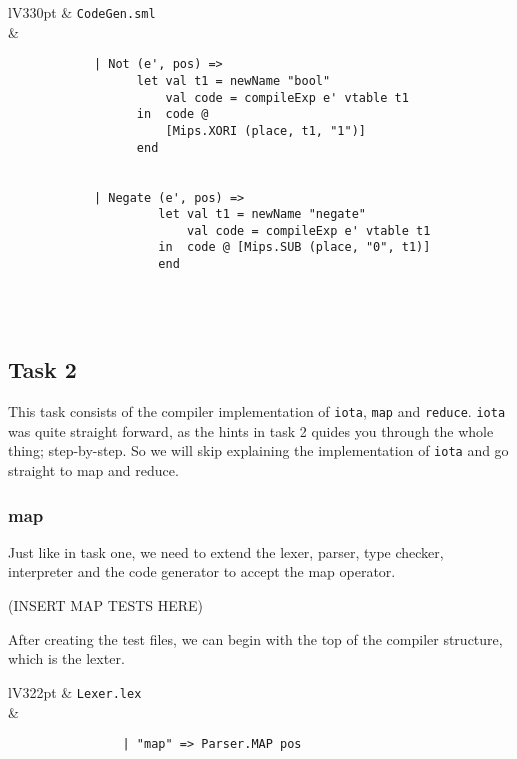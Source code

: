 \documentclass[a4paper]{article}
\begin{document}
\begin{center}	
	\begin{tabular}{lV{330pt}}
		\toprule
		& \verb|CodeGen.sml|\\
		\midrule
		&
		\begin{verbatim}
			| Not (e', pos) =>
			      let val t1 = newName "bool"
			          val code = compileExp e' vtable t1
			      in  code @ 
			          [Mips.XORI (place, t1, "1")]
			      end
			
			
			| Negate (e', pos) =>
			         let val t1 = newName "negate"
			             val code = compileExp e' vtable t1
			         in  code @ [Mips.SUB (place, "0", t1)]
			         end
		\end{verbatim}
		\\
		\bottomrule \\
	\end{tabular}
\end{center}

\subsection{Task 2}
	This task consists of the compiler implementation of \verb|iota|, \verb|map| and \verb|reduce|. \verb|iota| was quite straight forward, as the hints in task 2 quides you through the whole thing; step-by-step. So we will skip explaining the implementation of \verb|iota| and go straight to map and reduce.

\subsubsection{map}
	Just like in task one, we need to extend the lexer, parser, type checker, interpreter and the code generator to accept the map operator.
	
	(INSERT MAP TESTS HERE)
	
	After creating the test files, we can begin with the top of the compiler structure, which is the lexter.
	
	\begin{center}	
		\begin{tabular}{lV{322pt}}
			\toprule
			& \verb|Lexer.lex|\\
			\midrule
			&
			\begin{verbatim}
				| "map" => Parser.MAP pos
			\end{verbatim}
			\\
			\bottomrule \\
		\end{tabular}
	\end{center}
	
\end{document}

